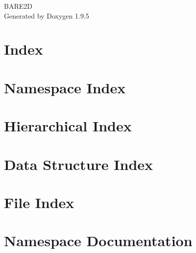 \documentclass[twoside]{book}
\newcommand{\+}{\discretionary{\mbox{\scriptsize$\hookleftarrow$}}{}{}}
\newcommand{\clearemptydoublepage}{%
    \newpage{\pagestyle{empty}\cleardoublepage}%
  }
\begin{document}
  \raggedbottom
    \hypersetup{pageanchor=false,
                bookmarksnumbered=true,
                pdfencoding=unicode
               }
  \begin{titlepage}
  \vspace*{7cm}
  \begin{center}%
  {\Large BARE2D}\\
  \vspace*{1cm}
  {\large Generated by Doxygen 1.9.5}\\
  \end{center}
  \end{titlepage}
  \clearemptydoublepage
  \tableofcontents
  \clearemptydoublepage
  \hypersetup{pageanchor=true}
\chapter{Index}
\label{index}\hypertarget{index}{}
\chapter{Namespace Index}

\chapter{Hierarchical Index}

\chapter{Data Structure Index}

\chapter{File Index}

\chapter{Namespace Documentation}





\end{document}
